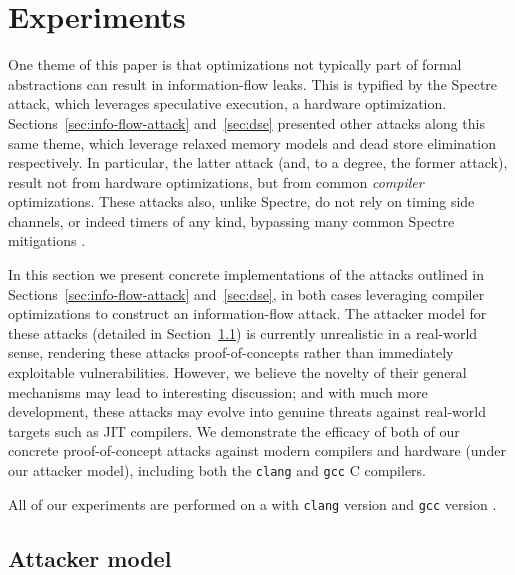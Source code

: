 \section{Experiments}
\label{sec:experiments}

One theme of this paper is that optimizations not typically part of formal
abstractions can result in information-flow leaks.
This is typified by the Spectre attack, which leverages speculative execution,
a hardware optimization.
Sections~\ref{sec:info-flow-attack} and~\ref{sec:dse} presented other attacks
along this same theme, which leverage relaxed memory models and dead store
elimination respectively.
In particular, the latter attack (and, to a degree, the former attack), result
not from hardware optimizations, but from common \emph{compiler} optimizations.
These attacks also, unlike Spectre, do not rely on timing side channels, or
indeed timers of any kind, bypassing many common Spectre mitigations
\cite{???}. %

In this section we present concrete implementations of the attacks outlined in
Sections~\ref{sec:info-flow-attack} and~\ref{sec:dse}, in both cases
leveraging compiler optimizations to construct an information-flow attack.
The attacker model for these attacks (detailed in
Section~\ref{subsec:attacker-model}) is currently unrealistic in a
real-world sense, rendering these attacks proof-of-concepts rather than
immediately exploitable vulnerabilities.
However, we believe the novelty of their general mechanisms may lead to
interesting discussion; and with much more development, these attacks may
evolve into genuine threats against real-world targets such as JIT compilers.
We demonstrate the efficacy of both of our concrete proof-of-concept
attacks against modern compilers and hardware (under our attacker model),
including both the \verb|clang| and \verb|gcc| C compilers.

All of our experiments are performed on a  with
\verb|clang| version  and \verb|gcc| version .

\subsection{Attacker model}
\label{subsec:attacker-model}

